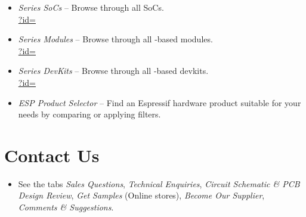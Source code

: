 {\begin{minipage}{\textwidth}
\begin{itemize}
    \item \textit{\chipseries{} Series SoCs} --
        {\small Browse through all \chipseries{} SoCs.}\\
        \href{\linkprefix\linkespsocsEN?id=\chipseries}{\linkprefix\linkespsocsEN?id=\chipseries}
    \item \textit{\chipseries{} Series Modules} --
        {\small Browse through all \chipseries{}-based modules.}\\
        \href{\linkprefix\linkespmodulesEN?id=\chipseries}{\linkprefix\linkespmodulesEN?id=\chipseries}
    \item \textit{\chipseries{} Series DevKits} --
        {\small Browse through all \chipseries{}-based devkits.}\\
        \href{\linkprefix\linkespdevkitsEN?id=\chipseries}{\linkprefix\linkespdevkitsEN?id=\chipseries}
    \item \textit{ESP Product Selector} --
        {\small Find an Espressif hardware product suitable for your needs by comparing or applying filters.}\\
        \href{\linkprefix\linkespproductselectorEN}{\linkprefix\linkespproductselectorEN}
\end{itemize}

\end{minipage}



\begin{minipage}{\textwidth}

\section*{Contact Us}

\begin{itemize}
    \item See the tabs \textit{Sales Questions}, \textit{Technical Enquiries}, \textit{Circuit Schematic \& PCB Design Review}, \textit{Get Samples} (Online stores), \textit{Become Our Supplier}, \textit{Comments \& Suggestions}.\\
        \href{\linkprefix\linksalesEN}{\linkprefix\linksalesEN}
\end{itemize}

\end{minipage}

}%
